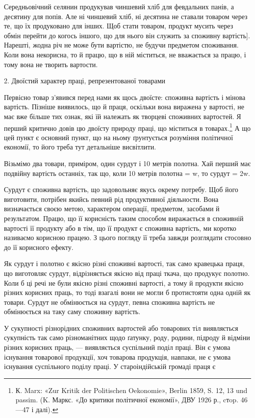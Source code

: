 \parcont{}  %
Середньовічний селянин продукував чиншевий хліб для февдальних
панів, а десятину для попів. Але ні чиншевий хліб, ні десятина
не ставали товаром через те, що їх продуковано для інших.
Щоб стати товаром, продукт мусить через обмін перейти до когось
іншого, що для нього він служить за споживну вартість]. Нарешті,
жодна річ не може бути вартістю, не будучи предметом
споживання. Коли вона некорисна, то й працю, що в ній міститься,
не вважається за працю, і тому вона не творить вартости.

2. Двоїстий характер праці, репрезентованої товарами

Первісно товар з’явився перед нами як щось двоїсте: споживна
вартість і мінова вартість. Пізніше виявилось, що й праця, оскільки
вона виражена у вартості, не має вже більше тих ознак,
які їй належать як творцеві споживних вартостей. Я перший
критично довів цю двоїсту природу праці, що міститься в товарах.\footnote{
К. Marx: «Zur Kritik der Politischen Oekonomie», Berlin 1859,
S. 12, 13 und passim. (K. Маркс. «До критики політичної економії», ДВУ
1926 р., cтop. 46—47 і далі).
} А що цей пункт є основний пункт, що на ньому ґрунтується
розуміння політичної економії, то його треба тут детальніше
висвітлити.

Візьмімо два товари, приміром, один сурдут і 10 метрів полотна.
Хай перший має подвійну вартість останніх, так що, коли
10 метрів полотна = w, то сурдут = 2w.

Сурдут є споживна вартість, що задовольняє якусь окрему
потребу. Щоб його виготовити, потрібен якийсь певний рід продуктивної
діяльности. Вона визначається своєю метою, характером
операції, предметом, засобами й результатом. Працю, що її
корисність таким способом виражається в споживній вартості її
продукту або в тім, що її продукт є споживна вартість, ми коротко
називаємо корисною працею. З цього погляду її треба завжди
розглядати стосовно до її корисного ефекту.

Як сурдут і полотно є якісно різні споживні вартості, так само
кравецька праця, що виготовляє сурдут, відрізняється якісно
від праці ткача, що продукує полотно. Коли б ці речі не були
якісно різні споживні вартості, а тому й продукти якісно різних
корисних праць, то тоді взагалі вони не могли б протистояти одна
одній як товари. Сурдут не обмінюється на сурдут, певна споживна
вартість не обмінюється на таку саму споживну вартість.

У сукупності різнорідних споживних вартостей або товарових
тіл виявляється сукупність так само різноманітних щодо ґатунку,
роду, родини, підроду й відміни різних корисних праць, — виявляється
суспільний поділ праці. Він є умова існування товарової
продукції, хоч товарова продукція, навпаки, не є умова існування
суспільного поділу праці. У староіндійській громаді праця є
\parbreak{}  %
